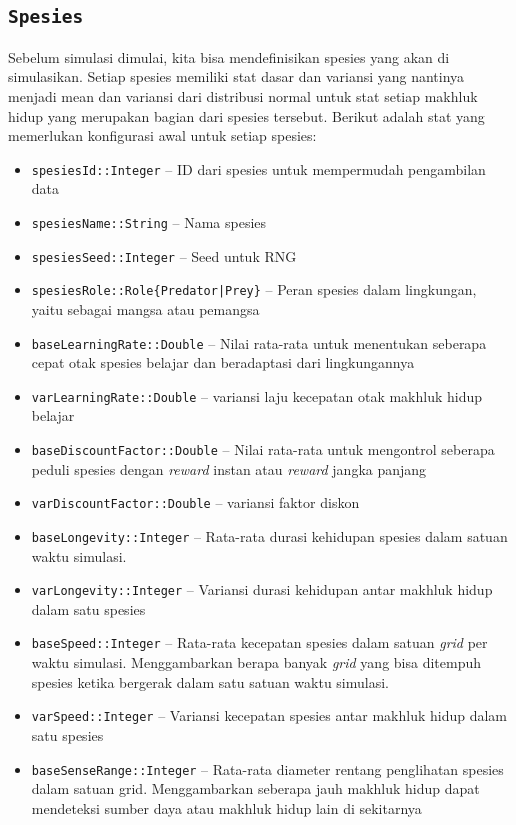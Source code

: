 \documentclass[12pt]{article}
\begin{document}
\subsection{\texttt{Spesies}}
Sebelum simulasi dimulai, kita bisa mendefinisikan spesies yang akan di simulasikan. Setiap spesies memiliki stat dasar dan variansi yang nantinya menjadi mean dan variansi dari distribusi normal untuk stat setiap makhluk hidup yang merupakan bagian dari spesies tersebut. Berikut adalah stat yang memerlukan konfigurasi awal untuk setiap spesies: 
\begin{itemize}
    \item \texttt{spesiesId::Integer} -- ID dari spesies untuk mempermudah pengambilan data
    \item \texttt{spesiesName::String} -- Nama spesies
    \item \texttt{spesiesSeed::Integer} -- Seed untuk RNG
    \item \texttt{spesiesRole::Role\{Predator|Prey\}} -- Peran spesies dalam lingkungan, yaitu sebagai mangsa atau pemangsa
    \item \texttt{baseLearningRate::Double} -- Nilai rata-rata untuk menentukan seberapa cepat otak spesies belajar dan beradaptasi dari lingkungannya
    \item \texttt{varLearningRate::Double} -- variansi laju kecepatan otak makhluk hidup belajar
    \item \texttt{baseDiscountFactor::Double} -- Nilai rata-rata untuk mengontrol seberapa peduli spesies dengan \textit{reward} instan atau \textit{reward} jangka panjang
    \item \texttt{varDiscountFactor::Double} -- variansi faktor diskon 
    \item \texttt{baseLongevity::Integer} -- Rata-rata durasi kehidupan spesies dalam satuan waktu simulasi.
    \item \texttt{varLongevity::Integer} -- Variansi durasi kehidupan antar makhluk hidup dalam satu spesies
    \item \texttt{baseSpeed::Integer} -- Rata-rata kecepatan spesies dalam satuan \textit{grid} per waktu simulasi. Menggambarkan berapa banyak \textit{grid} yang bisa ditempuh spesies ketika bergerak dalam satu satuan waktu simulasi.
    \item \texttt{varSpeed::Integer} -- Variansi kecepatan spesies antar makhluk hidup dalam satu spesies
    \item \texttt{baseSenseRange::Integer} -- Rata-rata diameter rentang penglihatan spesies dalam satuan grid. Menggambarkan seberapa jauh makhluk hidup dapat mendeteksi sumber daya atau makhluk hidup lain di sekitarnya

\end{itemize}
\end{document}
